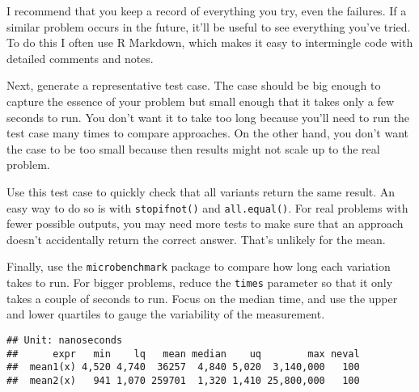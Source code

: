 I recommend that you keep a record of everything you try, even the
failures. If a similar problem occurs in the future, it'll be useful to
see everything you've tried. To do this I often use R Markdown, which
makes it easy to intermingle code with detailed comments and notes.

Next, generate a representative test case. The case should be big enough
to capture the essence of your problem but small enough that it takes
only a few seconds to run. You don't want it to take too long because
you'll need to run the test case many times to compare approaches. On
the other hand, you don't want the case to be too small because then
results might not scale up to the real problem.

Use this test case to quickly check that all variants return the same
result. An easy way to do so is with \texttt{stopifnot()} and
\texttt{all.equal()}. For real problems with fewer possible outputs, you
may need more tests to make sure that an approach doesn't accidentally
return the correct answer. That's unlikely for the mean.

\begin{Shaded}
\begin{Highlighting}[]
\StringTok{ }\NormalTok{(}\NormalTok{)}
\NormalTok{(}\NormalTok{(}
\end{Highlighting}
\end{Shaded}

Finally, use the \texttt{microbenchmark} package to compare how long
each variation takes to run. For bigger problems, reduce the
\texttt{times} parameter so that it only takes a couple of seconds to
run. Focus on the median time, and use the upper and lower quartiles to
gauge the variability of the measurement. 

\begin{Shaded}
\begin{Highlighting}[]
\NormalTok{(}
\NormalTok{)}
\end{Highlighting}
\end{Shaded}

\begin{verbatim}
## Unit: nanoseconds
##      expr   min    lq   mean median    uq        max neval
##  mean1(x) 4,520 4,740  36257  4,840 5,020  3,140,000   100
##  mean2(x)   941 1,070 259701  1,320 1,410 25,800,000   100
\end{verbatim}


